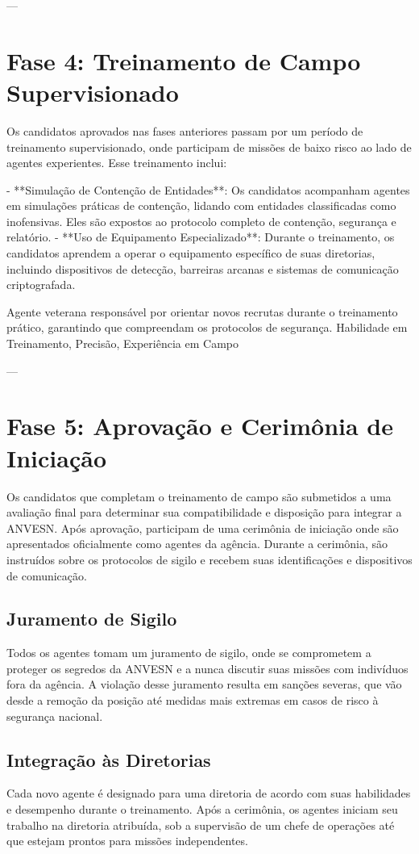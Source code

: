 ---

\section{Fase 4: Treinamento de Campo Supervisionado}
Os candidatos aprovados nas fases anteriores passam por um período de treinamento supervisionado, onde participam de missões de baixo risco ao lado de agentes experientes. Esse treinamento inclui:

- **Simulação de Contenção de Entidades**: Os candidatos acompanham agentes em simulações práticas de contenção, lidando com entidades classificadas como inofensivas. Eles são expostos ao protocolo completo de contenção, segurança e relatório.
- **Uso de Equipamento Especializado**: Durante o treinamento, os candidatos aprendem a operar o equipamento específico de suas diretorias, incluindo dispositivos de detecção, barreiras arcanas e sistemas de comunicação criptografada.

{Agente veterana responsável por orientar novos recrutas durante o treinamento prático, garantindo que compreendam os protocolos de segurança.}
{Habilidade em Treinamento, Precisão, Experiência em Campo}

---

\section{Fase 5: Aprovação e Cerimônia de Iniciação}
Os candidatos que completam o treinamento de campo são submetidos a uma avaliação final para determinar sua compatibilidade e disposição para integrar a ANVESN. Após aprovação, participam de uma cerimônia de iniciação onde são apresentados oficialmente como agentes da agência. Durante a cerimônia, são instruídos sobre os protocolos de sigilo e recebem suas identificações e dispositivos de comunicação.

\subsection{Juramento de Sigilo}
Todos os agentes tomam um juramento de sigilo, onde se comprometem a proteger os segredos da ANVESN e a nunca discutir suas missões com indivíduos fora da agência. A violação desse juramento resulta em sanções severas, que vão desde a remoção da posição até medidas mais extremas em casos de risco à segurança nacional.

\subsection{Integração às Diretorias}
Cada novo agente é designado para uma diretoria de acordo com suas habilidades e desempenho durante o treinamento. Após a cerimônia, os agentes iniciam seu trabalho na diretoria atribuída, sob a supervisão de um chefe de operações até que estejam prontos para missões independentes.

